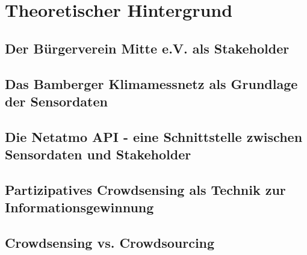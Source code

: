 \chapter{Theoretischer Hintergrund} %

\section{Der Bürgerverein Mitte e.V. als Stakeholder}

\section{Das Bamberger Klimamessnetz als Grundlage der Sensordaten}

\section{Die Netatmo API - eine Schnittstelle zwischen Sensordaten und Stakeholder}

\section{Partizipatives Crowdsensing als Technik zur Informationsgewinnung}

\section{Crowdsensing vs. Crowdsourcing}